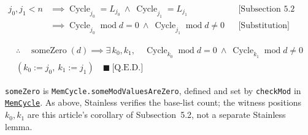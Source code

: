 \begin{equation*}
\begin{aligned}
j_0,j_1<n
  &\implies \operatorname{Cycle}_{j_0}=L_{j_0}\ \land\
    \operatorname{Cycle}_{j_1}=L_{j_1}
  && \text{[Subsection 5.2 Small Value in Cycle]} \\
  &\implies \operatorname{Cycle}_{j_0}\operatorname{mod}d=0\ \land\
    \operatorname{Cycle}_{j_1}\operatorname{mod}d\neq 0
  && \text{[Substitution]}
\end{aligned}
\end{equation*}

\begin{equation*}
\begin{gathered}
\therefore\quad
\operatorname{someZero}(d)\implies \exists\,k_0,k_1,\quad
\operatorname{Cycle}_{k_0}\operatorname{mod}d=0\ \land\
\operatorname{Cycle}_{k_1}\operatorname{mod}d\neq 0 \\
(k_0:=j_0,\ k_1:=j_1)\quad \blacksquare\ \text{[Q.E.D.]}
\end{gathered}
\end{equation*}

\texttt{someZero} is \texttt{MemCycle.someModValuesAreZero}, defined and set
by \texttt{checkMod} in
\href{https://github.com/thiagomata/prime-numbers/blob/cycle-article-v1.0.0/src/main/scala/v1/chapter4/cycle/memory/MemCycle.scala}{\texttt{MemCycle}}.
As above, Stainless verifies the base-list count; the witness positions
$k_0,k_1$ are this article's corollary of Subsection~5.2, not a separate
Stainless lemma.
